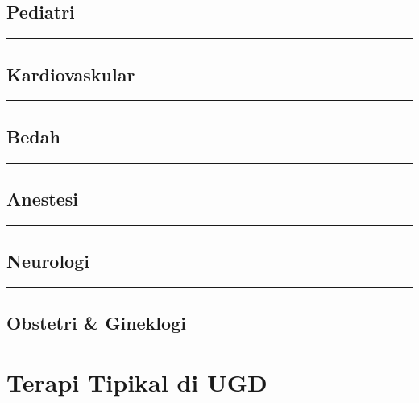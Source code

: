 \documentclass[
]{book}
\begin{document}
\hypertarget{pediatri}{%
\section{Pediatri}\label{pediatri}}

\begin{center}\rule{0.5\linewidth}{0.5pt}\end{center}

\hypertarget{kardiovaskular}{%
\section{Kardiovaskular}\label{kardiovaskular}}

\begin{center}\rule{0.5\linewidth}{0.5pt}\end{center}

\hypertarget{bedah}{%
\section{Bedah}\label{bedah}}

\begin{center}\rule{0.5\linewidth}{0.5pt}\end{center}

\hypertarget{anestesi}{%
\section{Anestesi}\label{anestesi}}

\begin{center}\rule{0.5\linewidth}{0.5pt}\end{center}

\hypertarget{neurologi}{%
\section{Neurologi}\label{neurologi}}

\begin{center}\rule{0.5\linewidth}{0.5pt}\end{center}

\hypertarget{obstetri-gineklogi}{%
\section{Obstetri \& Gineklogi}\label{obstetri-gineklogi}}

\hypertarget{terapi-tipikal-di-ugd}{%
\chapter{Terapi Tipikal di UGD}\label{terapi-tipikal-di-ugd}}
\end{document}
